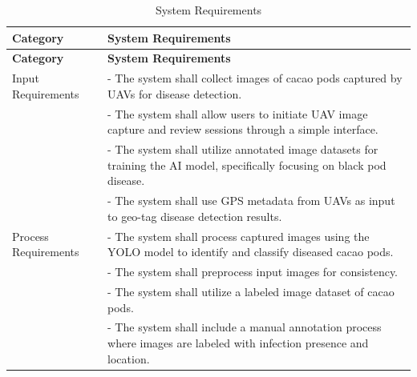 \begin{longtable}{p{4cm} p{8cm}}
	\caption{System Requirements} \label{tab:sysreq}                                                                                                                                      \\
	\toprule
	\textbf{Category}        & \textbf{System Requirements}                                                                                                                               \\
	\midrule
	\endfirsthead
	\toprule
	\textbf{Category}        & \textbf{System Requirements}                                                                                                                               \\
	\midrule
	\endhead
	\bottomrule
	\endfoot
	Input Requirements       & - The system shall collect images of cacao pods captured by UAVs for disease detection.                                                                    \\
	                         & - The system shall allow users to initiate UAV image capture and review sessions through a simple interface.                                               \\
	                         & - The system shall utilize annotated image datasets for training the AI model, specifically focusing on black pod disease.                                 \\
	                         & - The system shall use GPS metadata from UAVs as input to geo-tag disease detection results.                                                               \\
	\midrule
	Process Requirements     & - The system shall process captured images using the YOLO model to identify and classify diseased cacao pods.                                              \\
	                         & - The system shall preprocess input images for consistency.                                                                                                \\
	                         & - The system shall utilize a labeled image dataset of cacao pods.                                                                                          \\
	                         & - The system shall include a manual annotation process where images are labeled with infection presence and location.                                      \\

\end{longtable}
